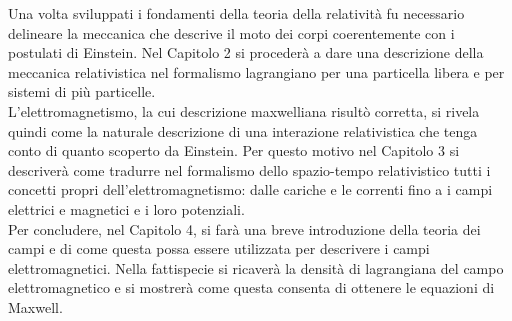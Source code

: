 Una volta sviluppati i fondamenti della teoria della relatività fu necessario delineare la meccanica che descrive il moto dei corpi coerentemente con i postulati di Einstein. Nel Capitolo 2 si procederà a dare una descrizione della meccanica relativistica nel formalismo lagrangiano per una particella libera e per sistemi di più particelle.\\

L'elettromagnetismo, la cui descrizione maxwelliana risultò corretta, si rivela quindi come la naturale descrizione di una interazione relativistica che tenga conto di quanto scoperto da Einstein. Per questo motivo nel Capitolo 3 si descriverà come tradurre nel formalismo dello spazio-tempo relativistico tutti i concetti propri dell'elettromagnetismo: dalle cariche e le correnti fino a i campi elettrici e magnetici e i loro potenziali.\\

Per concludere, nel Capitolo 4, si farà una breve introduzione della teoria dei campi e di come questa possa essere utilizzata per descrivere i campi elettromagnetici. Nella fattispecie si ricaverà la densità di lagrangiana del campo elettromagnetico e si mostrerà come questa consenta di ottenere le equazioni di Maxwell.